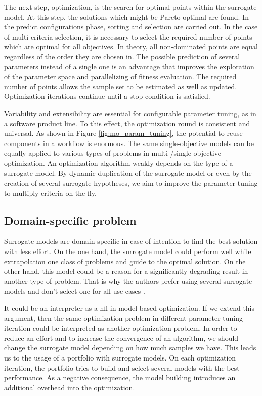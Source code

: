             The next step, optimization, is the search for optimal points within the surrogate model. At this step, the solutions which might be Pareto-optimal are found. In the predict configurations phase, sorting and selection are carried out. In the case of multi-criteria selection, it is necessary to select the required number of points which are optimal for all objectives. In theory, all non-dominated points are equal regardless of the order they are chosen in. The possible prediction of several parameters instead of a single one is an advantage that improves the exploration of the parameter space and parallelizing of fitness evaluation. The required number of points allows the sample set to be estimated as well as updated. Optimization iterations continue until a stop condition is satisfied.
    
            Variability and extensibility are essential for configurable parameter tuning, as in a software product line. To this effect, the optimization round is consistent and universal. As shown in Figure \ref{fig:mo_param_tuning}, the potential to reuse components in a workflow is enormous. The same single-objective models can be equally applied to various types of problems in multi-/single-objective optimization. An optimization algorithm weakly depends on the type of a surrogate model. By dynamic duplication of the surrogate model or even by the creation of several surrogate hypotheses, we aim to improve the parameter tuning to multiply criteria on-the-fly.

        \subsection{Domain-specific problem}
        Surrogate models are domain-specific in case of intention to find the best solution with less effort. On the one hand, the surrogate model could perform well while extrapolation one class of problems and guide to the optimal solution. On the other hand, this model could be a reason for a significantly degrading result in another type of problem. That is why the authors prefer using several surrogate models and don't select one for all use cases \cite{SoftSurvey}.

        It could be an interpreter as a \Gls{nfl} in model-based optimization. If we extend this argument, then the same optimization problem in different parameter tuning iteration could be interpreted as another optimization problem. In order to reduce an effort and to increase the convergence of an algorithm, we should change the surrogate model depending on how much samples we have. 
        This leads us to the usage of a portfolio with surrogate models. On each optimization iteration, the portfolio tries to build and select several models with the best performance.  As a negative consequence, the model building introduces an additional overhead into the optimization.


